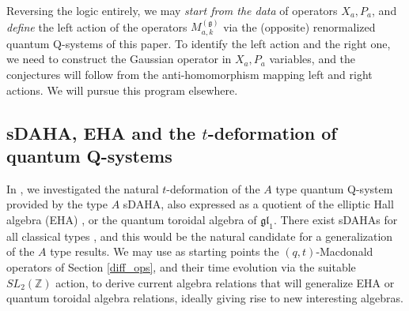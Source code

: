 \documentclass[12pt]{amsart}
\newcommand{\g}{{\mathfrak{g}}}
\newcommand{\gl}{{\mathfrak{gl}}}
\newcommand{\Z}{{\mathbb Z}}
\numberwithin{equation}{section}
\numberwithin{table}{section}
\begin{document}
Reversing the logic entirely, we may {\it start from the data} of operators $X_a,P_a$, and {\it define} the left action
of the operators $M_{a,k}^{(\g)}$ via the (opposite)
renormalized quantum Q-systems of this paper. To identify the left action and the right one, we need
to construct the Gaussian operator in $X_a,P_a$ variables, and the conjectures will follow from the anti-homomorphism mapping left and right actions. We will pursue this program elsewhere.



\subsection{sDAHA, EHA and the $t$-deformation of quantum Q-systems}

In \cite{DFKqt}, we investigated the natural $t$-deformation of the $A$ type quantum Q-system provided
by the type $A$ sDAHA, also expressed as a quotient of the elliptic Hall algebra (EHA) \cite{SCHIFFEHA}, or the
quantum toroidal algebra of ${\gl}_1$. There exist sDAHAs for all classical types \cite{Cheredbook}, and this would be the natural candidate for a generalization of the $A$ type results.
We may use as starting points the $(q,t)$-Macdonald operators of Section \ref{diff_ops}, and their time evolution via the suitable $SL_2(\Z)$ action, to derive current algebra relations that will generalize
EHA or quantum toroidal algebra relations, ideally giving rise to new interesting algebras.
\end{document}
